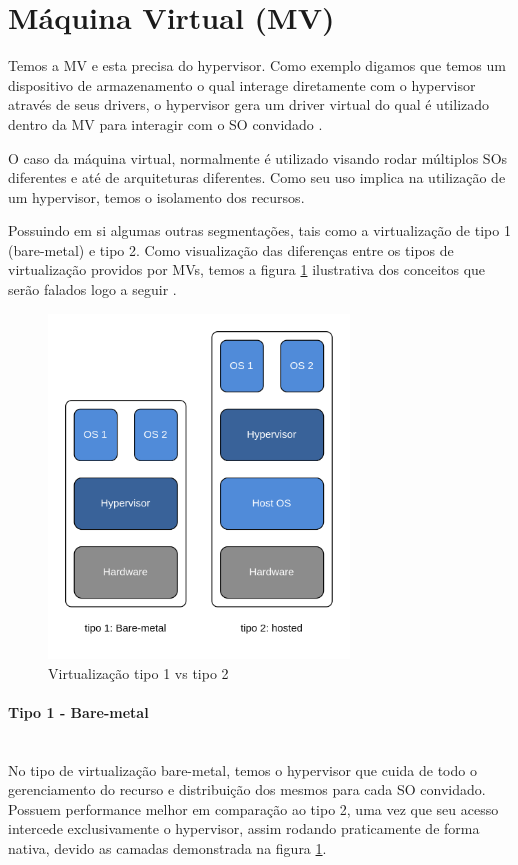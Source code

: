 \section{Máquina Virtual (MV)}
\label{chp:referencial_teorico::sct:maquina_virtual}
Temos a MV e esta precisa do hypervisor. Como exemplo digamos que temos um dispositivo de armazenamento o qual interage diretamente com o hypervisor através de seus drivers, o hypervisor gera um driver virtual do qual é utilizado dentro da MV para interagir com o SO convidado \cite{docker_diff_standard_virt}.

O caso da máquina virtual, normalmente é utilizado visando rodar múltiplos SOs diferentes e até de arquiteturas diferentes. Como seu uso implica na utilização de um hypervisor, temos o isolamento dos recursos.

Possuindo em si algumas outras segmentações, tais como a virtualização de tipo 1 (bare-metal) e tipo 2. Como visualização das diferenças entre os tipos de virtualização providos por MVs, temos a figura \ref{fig:virtualization_t1_vs_t2} ilustrativa dos conceitos que serão falados logo a seguir \cite{kernelscheepers, Virtualization_vs_Containerization}.

\begin{figure}
    \centering
    \includegraphics[width=8cm]{images/vm_t1_vs_t2.drawio.png}
    \caption{Virtualização tipo 1 vs tipo 2}
    \label{fig:virtualization_t1_vs_t2}
\end{figure}

\paragraph*{Tipo 1 - Bare-metal}\mbox{}\\
No tipo de virtualização bare-metal, temos o hypervisor que cuida de todo o gerenciamento do recurso e distribuição dos mesmos para cada SO convidado. Possuem performance melhor em comparação ao tipo 2, uma vez que seu acesso intercede exclusivamente o hypervisor, assim rodando praticamente de forma nativa, devido as camadas demonstrada na figura \ref{fig:virtualization_t1_vs_t2}.

